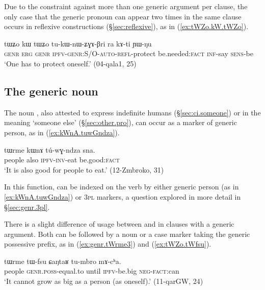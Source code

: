 Due to the constraint against more than one generic argument per clause, the only case that the generic pronoun can appear two times in the same clause occurs in reflexive constructions (§\ref{sec:reflexive}), as in (\ref{ex:tWZo.kW.tWZo}).

\begin{exe}
\ex \label{ex:tWZo.kW.tWZo}
\gll tɯʑo kɯ tɯʑo tu-kɯ-nɯ-ʑɣɤ-βri ra kɤ-ti ɲɯ-ŋu \\
\textsc{genr} \textsc{erg} \textsc{genr} \textsc{ipfv}-\textsc{genr}:S/O-\textsc{auto}-\textsc{refl}-protect be.needed:\textsc{fact} \textsc{inf}-say \textsc{sens}-be \\
\glt `One has to protect oneself.' (04-qala1, 25)
\end{exe} 

\subsection{The generic noun } \label{sec:tWrme.generic}
The noun , also attested to express indefinite humans (§\ref{sec:ci.someone}) or in the meaning `someone else' (§\ref{sec:other.pro}), can occur as a marker of generic person, as in (\ref{ex:kWnA.tuwGndza}).
 
\begin{exe}
\ex \label{ex:kWnA.tuwGndza}
\gll  tɯrme kɯnɤ tú-wɣ-ndza sna. \\
 people also \textsc{ipfv}-\textsc{inv}-eat be.good:\textsc{fact} \\
\glt `It is also good for people to eat.' (12-Zmbroko, 31)
\end{exe}
 
In this function,  can be indexed on the verb by either generic person (as in \ref{ex:kWnA.tuwGndza}) or \textsc{3pl} markers, a question explored in more detail in §\ref{sec:genr.3pl}.

There is a slight difference of usage between  and  in clauses with a generic argument. Both can be followed by a noun or a case marker taking the generic possessive prefix, as in (\ref{ex:genr.tWrme3}) and (\ref{ex:tWZo.tWfsu}). 

\begin{exe}
\ex  \label{ex:genr.tWrme3}
\gll tɯrme tɯ-fsu ɕaŋtaʁ tu-mbro mɤ-cʰa. \\
people \textsc{genr}.\textsc{poss}-equal.to until \textsc{ipfv}-be.big \textsc{neg}-\textsc{fact}:can \\ 
\glt `It cannot grow as big as a person (as oneself).' (11-qarGW, 24)
\end{exe}

